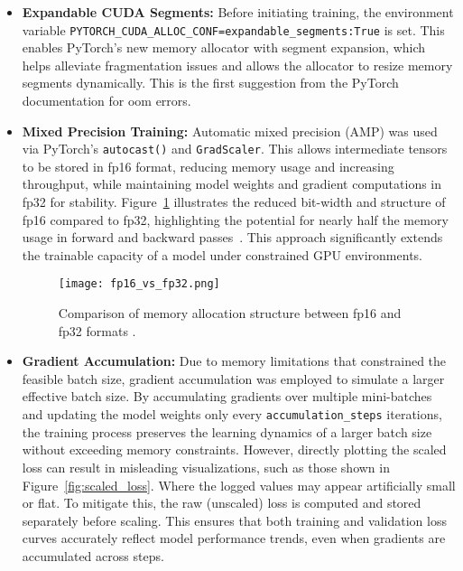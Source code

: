 \begin{itemize}
    \item \textbf{Expandable CUDA Segments:} Before initiating training, the environment variable \texttt{PYTORCH\_CUDA\_ALLOC\_CONF=expandable\_segments:True} is set. This enables PyTorch’s new memory allocator with segment expansion, which helps alleviate fragmentation issues and allows the allocator to resize memory segments dynamically. This is the first suggestion from the PyTorch documentation for \gls{oom} errors.

    \item \textbf{Mixed Precision Training:} Automatic mixed precision (AMP) was used via PyTorch’s \texttt{autocast()} and \texttt{GradScaler}. This allows intermediate tensors to be stored in \gls{fp16} format, reducing memory usage and increasing throughput, while maintaining model weights and gradient computations in \gls{fp32} for stability. Figure~\ref{fig:fp16_vs_fp32} illustrates the reduced bit-width and structure of \gls{fp16} compared to \gls{fp32}, highlighting the potential for nearly half the memory usage in forward and backward passes~\cite{mindspore_mixed_precision}. This approach significantly extends the trainable capacity of a model under constrained GPU environments.

    \begin{figure}[H]
        \centering
        \texttt{[image: fp16\_vs\_fp32.png]}
        \caption{Comparison of memory allocation structure between \gls{fp16} and \gls{fp32} formats \cite{mindspore_mixed_precision}.}
        \label{fig:fp16_vs_fp32}
    \end{figure}

    \item \textbf{Gradient Accumulation:} Due to memory limitations that constrained the feasible batch size, gradient accumulation was employed to simulate a larger effective batch size. By accumulating gradients over multiple mini-batches and updating the model weights only every \texttt{accumulation\_steps} iterations, the training process preserves the learning dynamics of a larger batch size without exceeding memory constraints. However, directly plotting the scaled loss can result in misleading visualizations, such as those shown in Figure~\ref{fig:scaled_loss}. Where the logged values may appear artificially small or flat. To mitigate this, the raw (unscaled) loss is computed and stored separately before scaling. This ensures that both training and validation loss curves accurately reflect model performance trends, even when gradients are accumulated across steps.


\end{itemize}
